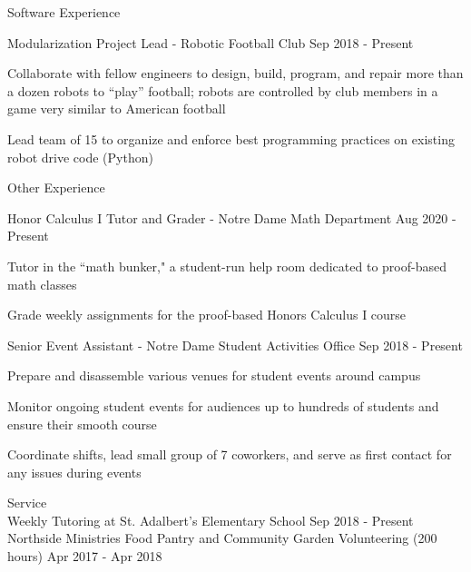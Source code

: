 \documentclass[10pt]{resume} %
\begin{document}
\begin{rSection}{ Software Experience }
\begin{rSubsection}{ Modularization Project Lead - Robotic Football Club }{ Sep 2018 - Present }{}{}
\item Collaborate with fellow engineers to design, build, program, and repair more than a dozen robots to ``play'' football; robots are controlled by club members in a game very similar to American football
\item Lead team of 15 to organize and enforce best programming practices on existing robot drive code (Python)
\end{rSubsection}

\end{rSection}


\begin{rSection}{Other Experience}

\begin{rSubsection}{ Honor Calculus I Tutor and Grader - Notre Dame Math Department }{ Aug 2020 - Present }{}{}
\item Tutor in the ``math bunker," a student-run help room dedicated to proof-based math classes
\item Grade weekly assignments for the proof-based Honors Calculus I course
\end{rSubsection}


\begin{rSubsection}{ Senior Event Assistant - Notre Dame Student Activities Office }{ Sep 2018 - Present }{}{}
\item Prepare and disassemble various venues for student events around campus
\item Monitor ongoing student events for audiences up to hundreds of students and ensure their smooth course
\item Coordinate shifts, lead small group of 7 coworkers, and serve as first contact for any issues during events
\end{rSubsection}

\end{rSection}

\begin{rSection}{Service}
\\ { Weekly Tutoring at St. Adalbert's Elementary School } \hfill { Sep 2018 - Present }
\\ { Northside Ministries Food Pantry and Community Garden Volunteering (200 hours) } \hfill { Apr 2017 - Apr 2018}
\end{rSection}
\end{document}
